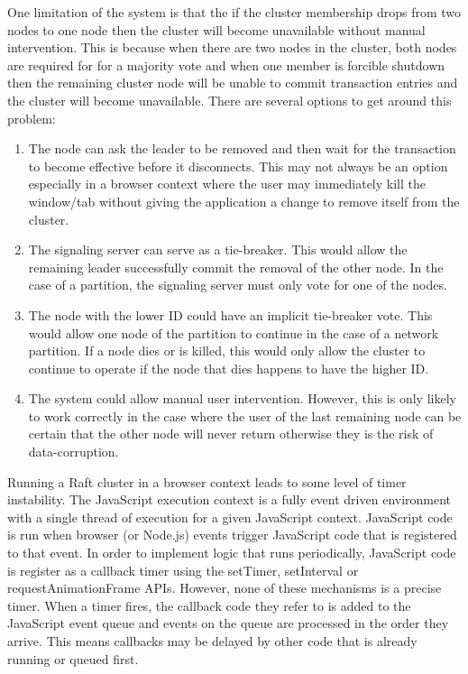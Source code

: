 \documentclass[9pt]{extarticle}
\begin{document}
\begin{multicols}{2}
One limitation of the system is that the if the cluster membership
drops from two nodes to one node then the cluster will become
unavailable without manual intervention. This is because when there
are two nodes in the cluster, both nodes are required for for
a majority vote and when one member is forcible shutdown then the
remaining cluster node will be unable to commit transaction entries
and the cluster will become unavailable. There are several options to
get around this problem:

\begin{enumerate}
\item The node can ask the leader to be removed and then wait for the
  transaction to become effective before it disconnects.  This may not
  always be an option especially in a browser context where the user
  may immediately kill the window/tab without giving the application
  a change to remove itself from the cluster.
\item The signaling server can serve as a tie-breaker. This would allow
  the remaining leader successfully commit the removal of the other
  node. In the case of a partition, the signaling server must only
  vote for one of the nodes.
\item The node with the lower ID could have an implicit tie-breaker vote.
  This would allow one node of the partition to continue in the case
  of a network partition. If a node dies or is killed, this would only
  allow the cluster to continue to operate if the node that dies
  happens to have the higher ID.
\item The system could allow manual user intervention. However, this is
  only likely to work correctly in the case where the user of the last
  remaining node can be certain that the other node will never return
  otherwise they is the risk of data-corruption.
\end{enumerate}

Running a Raft cluster in a browser context leads to some level of
timer instability. The JavaScript execution context is a fully event
driven environment with a single thread of execution for a given
JavaScript context. JavaScript code is run when browser (or Node.js)
events trigger JavaScript code that is registered to that event. In
order to implement logic that runs periodically, JavaScript code
is register as a callback timer using the setTimer, setInterval or
requestAnimationFrame APIs. However, none of these mechanisms is
a precise timer. When a timer fires, the callback code they refer to
is added to the JavaScript event queue and events on the queue are
processed in the order they arrive. This means callbacks may be
delayed by other code that is already running or queued first.


\end{multicols}
\end{document}
